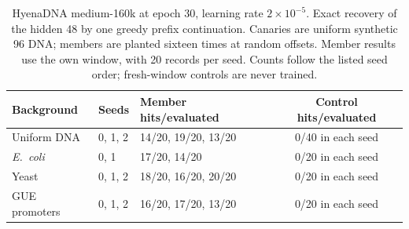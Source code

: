\begin{table}[tbp]
\centering
\caption{HyenaDNA medium-160k at epoch 30, learning rate $2\times10^{-5}$.
Exact recovery of the hidden 48\nt{} by one greedy prefix continuation.
Canaries are uniform synthetic 96\nt{} DNA; members are planted sixteen times at random offsets.
Member results use the own window, with 20 records
per seed. Counts follow the listed seed order; fresh-window controls are never trained.}
\label{tab:hyena30}
\begin{tabular}{lllc}
\toprule
Background & Seeds & Member hits/evaluated & Control hits/evaluated \\
\midrule
Uniform DNA & 0, 1, 2 & 14/20, 19/20, 13/20 & 0/40 in each seed \\
\emph{E.~coli} & 0, 1 & 17/20, 14/20 & 0/20 in each seed \\
Yeast & 0, 1, 2 & 18/20, 16/20, 20/20 & 0/20 in each seed \\
GUE promoters & 0, 1, 2 & 16/20, 17/20, 13/20 & 0/20 in each seed \\
\bottomrule
\end{tabular}
\end{table}
